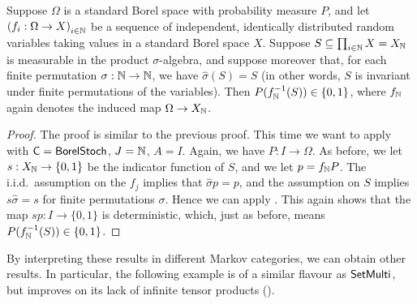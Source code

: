 \documentclass[11pt]{article}
\begin{document}
\begin{corollary}
    Suppose $\Omega$ is a standard Borel space with probability measure $P$, and let $\left(f_i: \Omega \to X\right)_{i\in \mathbb{N}}$ be a sequence of independent, identically distributed random variables taking values in a standard Borel space $X$.
    Suppose $S \subseteq \prod_{i \in \mathbb{N}} X = X_{\mathbb{N}}$ is measurable in the product $\sigma$-algebra, and suppose moreover that, for each finite permutation $\sigma: \mathbb{N} \to \mathbb{N}$, we have $\hat{\sigma}(S) = S$ (in other words, $S$ is invariant under finite permutations of the variables).
    Then $P(f_{\mathbb{N}}^{-1}(S)) \in \{0,1\}$, where $f_{\mathbb{N}}$ again denotes the induced map $\Omega \to X_{\mathbb{N}}$.
\end{corollary}
\begin{proof}
    The proof is similar to the previous proof. This time we want to apply  with $\mathsf{C} = \operatorname{\mathsf{BorelStoch}}$, $J = \mathbb{N}$, $A = I$.
    Again, we have $P: I \to \Omega$.
    As before, we let $s: X_{\mathbb{N}} \to \{0,1\}$ be the indicator function of $S$, and we let $p = f_{\mathbb{N}} P$.
    The i.i.d.~assumption on the $f_j$ implies that $\hat{\sigma}p = p$, and the assumption on $S$ implies $s\hat{\sigma} = s$ for finite permutations $\sigma$.
    Hence we can apply . This again shows that the map $sp: I \to \{0,1\}$ is deterministic, which, just as before, means $P(f_{\mathbb{N}}^{-1}(S)) \in \{0,1\}$.
\end{proof} 

By interpreting these results in different Markov categories, we can obtain other results.
In particular, the following example is of a similar flavour as $\operatorname{\mathsf{SetMulti}}$, but improves on its lack of infinite tensor products ().
\end{document}
